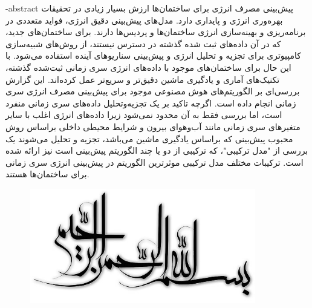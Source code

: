 \department{}

\fa-abstract{
    پیش‌بینی مصرف انرژی برای ساختمان‌ها ارزش بسیار زیادی در تحقیقات بهره‌وری انرژی و پایداری دارد. مدل‌های پیش‌بینی دقیق انرژی، فواید متعددی در برنامه‌ریزی
     و بهینه‌سازی انرژی ساختمان‌ها و پردیس‌ها دارند. برای ساختمان‌های جدید، 
    که در آن داده‌های ثبت شده گذشته در دسترس نیستند، از روش‌های شبیه‌سازی کامپیوتری برای تجزیه و تحلیل انرژی و پیش‌بینی سناریوهای آینده استفاده می‌شود.
    با این‌ حال برای ساختمان‌های موجود با داده‌های انرژی سری زمانی ثبت‌شده گذشته، تکنیک‌های آماری و یادگیری ماشین دقیق‌تر و سریع‌تر عمل کرده‌اند. 
    این گزارش بررسی‌ای بر الگوریتم‌های هوش مصنوعی موجود برای پیش‌بینی مصرف انرژی سری زمانی انجام داده است.
     اگرچه تاکید بر یک تجزیه‌و‌تحلیل داده‌های سری زمانی منفرد است، اما بررسی فقط به آن محدود نمی‌شود زیرا داده‌های انرژی 
     اغلب با سایر متغیرهای سری زمانی مانند آب‌و‌هوای بیرون و شرایط محیطی داخلی براساس روش محبوب پیش‌بینی که براساس یادگیری ماشین می‌باشد، تجزیه و تحلیل می‌شوند 
      یک بررسی از "مدل ترکیبی"، که ترکیبی از دو یا چند الگوریتم پیش‌بینی است نیز ارائه شده است.
      ترکیبات مختلف مدل ترکیبی موثرترین الگوریتم در پیش‌بینی انرژی سری زمانی برای ساختمان‌ها هستند.
}




\AUTtitle
\vspace*{7cm}
\thispagestyle{empty}
\begin{center}
\includegraphics[height=5cm,width=12cm]{besm}
\end{center}